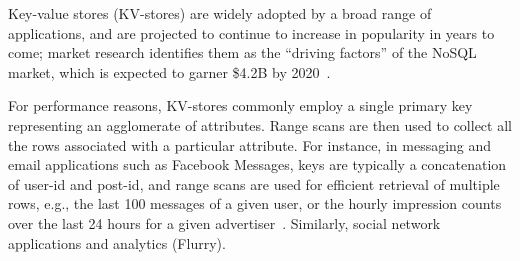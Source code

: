 


Key-value stores (KV-stores) are widely adopted by a broad range of applications, and are projected
to continue to increase in popularity in years to come; market research  identifies them as the 
``driving factors'' of the NoSQL market, which is expected to garner \$4.2B by 2020~\cite{alliedmarketresearch}.

For performance reasons,  KV-stores  commonly employ a single primary key representing 
an agglomerate of attributes. Range scans are then used to collect all the rows associated with
a particular attribute. For instance,  in messaging and email applications such as  Facebook Messages,
keys are typically a concatenation of user-id and post-id, and range scans are used 
for efficient retrieval of multiple rows, e.g., the last 100
messages of a given user, or the hourly impression counts over the last 24 hours for a given advertiser~\cite{Borthakur:2011:AHG:1989323.1989438}. 
Similarly, social network applications 
and analytics (Flurry).



